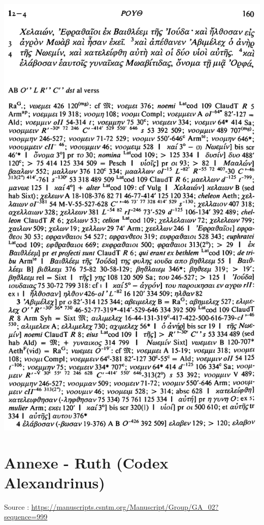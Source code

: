 \documentclass[11pt,a4paper]{article}
\begin{document}
\includegraphics[width=\textwidth]{img/LXX_ruth_1_2.png}

\section*{Annexe  - Ruth (Codex Alexandrinus)}
    Source : \href{https://manuscripts.csntm.org/Manuscript/Group/GA_02?sequence=999}{https://manuscripts.csntm.org/Manuscript/Group/GA\_02?sequence=999}\\
    
\end{document}
